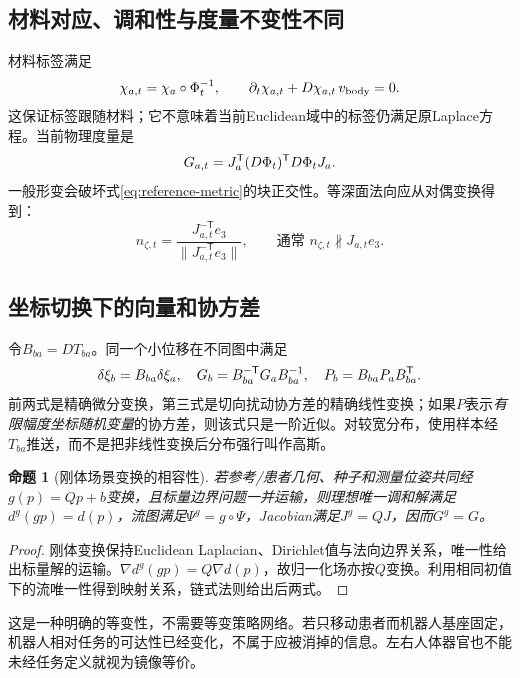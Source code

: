 \documentclass[UTF8,11pt,a4paper,fontset=fandol]{ctexart}
\numberwithin{equation}{section}
\theoremstyle{plain}
\newtheorem{proposition}{命题}[section]
\theoremstyle{definition}
\theoremstyle{remark}
\begin{document}
\subsection{材料对应、调和性与度量不变性不同}
材料标签满足
\begin{equation}
 \chi_{a,t}=\chi_a\circ\Phi_t^{-1},\qquad
 \partial_t\chi_{a,t}+D\chi_{a,t}\,v_{\rm body}=0.
 \label{eq:material-advection}
\end{equation}
这保证标签跟随材料；它不意味着当前Euclidean域中的标签仍满足原Laplace方程。当前物理度量是
\begin{equation}
 G_{a,t}=J_a^{\mathsf T}(D\Phi_t)^{\mathsf T} D\Phi_t J_a.
 \label{eq:live-metric}
\end{equation}
一般形变会破坏式\eqref{eq:reference-metric}的块正交性。等深面法向应从对偶变换得到：
\begin{equation}
 n_{\zeta,t}=\frac{J_{a,t}^{-\mathsf T}e_3}{\|J_{a,t}^{-\mathsf T}e_3\|},
 \qquad\text{通常 }n_{\zeta,t}\not\parallel J_{a,t}e_3.
 \label{eq:normal-dual}
\end{equation}

\subsection{坐标切换下的向量和协方差}
令$B_{ba}=DT_{ba}$。同一个小位移在不同图中满足
\begin{equation}
 \delta\xi_b=B_{ba}\delta\xi_a,\quad
 G_b=B_{ba}^{-\mathsf T}G_aB_{ba}^{-1},\quad
 P_b=B_{ba}P_aB_{ba}^{\mathsf T}.
 \label{eq:chart-tensors}
\end{equation}
前两式是精确微分变换，第三式是切向扰动协方差的精确线性变换；如果$P$表示\emph{有限幅度坐标随机变量}的协方差，则该式只是一阶近似。对较宽分布，使用样本经$T_{ba}$推送，而不是把非线性变换后分布强行叫作高斯。

\begin{proposition}[刚体场景变换的相容性]\label{prop:rigid}
若参考/患者几何、种子和测量位姿共同经$g(p)=Qp+b$变换，且标量边界问题一并运输，则理想唯一调和解满足$d^g(gp)=d(p)$，流图满足$\Psi^g=g\circ\Psi$，Jacobian满足$J^g=QJ$，因而$G^g=G$。
\end{proposition}
\begin{proof}
刚体变换保持Euclidean Laplacian、Dirichlet值与法向边界关系，唯一性给出标量解的运输。$\nabla d^g(gp)=Q\nabla d(p)$，故归一化场亦按$Q$变换。利用相同初值下的流唯一性得到映射关系，链式法则给出后两式。
\end{proof}

这是一种明确的等变性，不需要等变策略网络。若只移动患者而机器人基座固定，机器人相对任务的可达性已经变化，不属于应被消掉的信息。左右人体器官也不能未经任务定义就视为镜像等价。
\end{document}
